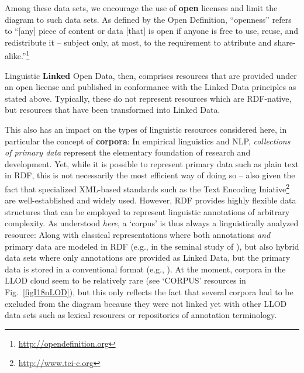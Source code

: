 Among these data sets, we encourage the use of \textbf{open} licenses and limit the diagram to such data sets. As defined by the Open Definition, ``openness'' refers to ``[any] piece of content or data [that] is open if anyone is free to use, reuse, and redistribute it -- subject only, at most, to the requirement to attribute and share-alike.''\footnote{\url{http://opendefinition.org}}

Linguistic \textbf{Linked} Open Data, then, comprises resources that are provided under an open license and published in conformance with the Linked Data principles as stated above.
Typically, these do not represent resources which are RDF-native, but resources that have been transformed into Linked Data. 

This also has an impact on the types of linguistic resources considered here, in particular the concept of \textbf{corpora}:
In empirical linguistics and NLP, \emph{collections of primary data} represent the elementary foundation of research and development. 
Yet, while it is possible to represent primary data such as plain text in RDF, this is not necessarily the most efficient way of doing so -- also given the fact that specialized XML-based standards such as the Text Encoding Iniative\footnote{
	\url{http://www.tei-c.org}
}
are well-established and widely used.
However, RDF provides highly flexible data structures that can be employed to represent linguistic annotations of arbitrary complexity. 
As understood \emph{here}, a `corpus' is thus always a linguistically analyzed resource:
Along with classical representations where both annotations \emph{and} primary data are modeled in RDF (e.g., in the seminal study of \citep{burchardt2008formalising}), 
but also hybrid data sets where only annotations are provided as Linked Data, but the primary data is stored in a conventional format (e.g., \citep{cassidy2010rdf}).
At the moment, corpora in the LLOD cloud seem to be relatively rare (see `CORPUS' resources in Fig.\ \ref{figI18nLOD}), 
but this only reflects the fact that several corpora had to be excluded from the diagram because they were not linked yet with other LLOD data sets such as lexical resources or repositories of annotation terminology.

